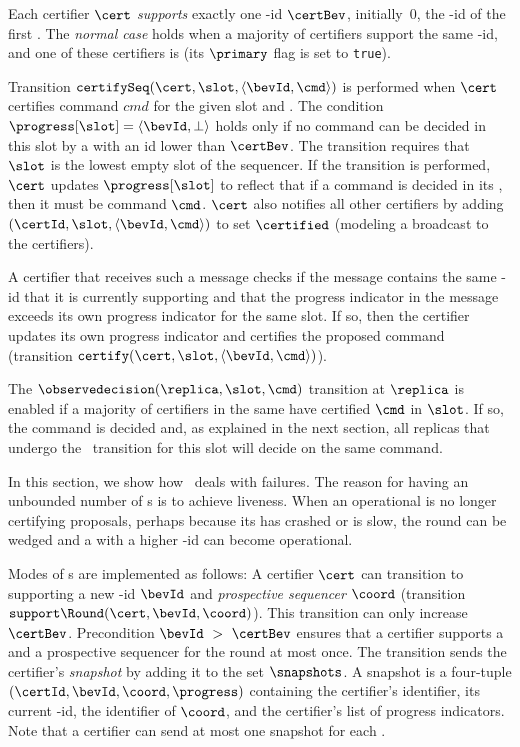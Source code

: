 Each certifier $\cert$ \emph{supports}
exactly one {\round}-id $\certBev$, initially~$0$, the {\round}-id of the
first {\round}.
The \emph{normal case} holds when a majority of certifiers support
the same {\round}-id, and one of these certifiers is {\sequencer} (its $\primary$ flag is set to \texttt{true}).

Transition $\texttt{certifySeq}(\cert, \slot, \langle \bevId, \cmd \rangle)$
is performed when {\sequencer} $\cert$ certifies command $cmd$ for the given slot
and {\round}.
The condition $\progress[\slot] = \langle \bevId, \bot \rangle$
holds only if no command can be decided in this slot
by a {\round} with an id lower than $\certBev$.
The transition requires that $\slot$ is the lowest empty slot of the
sequencer.
If the transition is performed,
$\cert$ updates $\progress[\slot]$ to reflect that if a command is
decided in its {\round}, then it must be command $\cmd$.
{\Sequencer} $\cert$ also notifies all other certifiers by adding
$(\certId, \slot, \langle \bevId, \cmd \rangle)$ to set $\certified$
(modeling a broadcast to the certifiers).

A certifier that receives such a message checks if the message
contains the same {\round}-id that it is currently supporting and that
the progress indicator in the message exceeds its own progress
indicator for the same slot.  If so, then the certifier updates its
own progress indicator and certifies the proposed command (transition
$\texttt{certify}(\cert, \slot, \langle \bevId, \cmd \rangle)$).


The $\texttt{\observedecision}(\replica, \slot, \cmd)$
transition at $\replica$ is enabled if a majority of
certifiers in the same {\round} have certified $\cmd$ in $\slot$.
If so, the command is decided and, as explained in the next section,
all replicas that undergo the \observedecision\ transition
for this slot will decide on the same command.

\label{sec:recovery}

In this section, we show how \multiconsensus\ deals with failures.
The reason for having an unbounded number of {\round}s is to achieve liveness.
When an operational {\round} is no longer certifying proposals,
perhaps because its {\sequencer} has crashed or is slow,
the round can be
wedged and a {\round} with a higher {\round}-id can become operational.

Modes of {\round}s are implemented as follows:
A certifier $\cert$ can transition to supporting a new {\round}-id
$\bevId$ and \emph{prospective sequencer} $\coord$
(transition $\texttt{support{\Round}}(\cert, \bevId, \coord)$).
This transition can only increase $\certBev$.
Precondition $\bevId~>~\certBev$ ensures that a certifier supports a {\round} and a prospective sequencer for the round at most once.
The transition sends the certifier's \emph{snapshot} by adding it to the
set $\snapshots$.
A snapshot is a four-tuple $(\certId, \bevId, \coord, \progress)$ containing
the certifier's identifier, its current {\round}-id, the identifier of $\coord$, and
the certifier's list of progress indicators.
Note that a certifier can send at most one snapshot for each {\round}.

